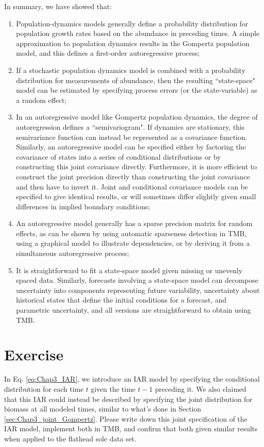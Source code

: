 In summary, we have showed that:
\begin{enumerate}
    \item Population-dynamics models generally define a probability distribution for population growth rates based on the abundance in preceding times. A simple approximation to population dynamics results in the Gompertz population model, and this defines a first-order autoregressive process;

    \item If a stochastic population dynamics model is combined with a probability distribution for measurements of abundance, then the resulting ``state-space" model can be estimated by specifying process errors (or the state-variable) as a random effect;
    
    \item In an autoregressive model like Gompertz population dynamics, the degree of autoregression defines a ``semivariogram". If dynamics are stationary, this semivariance function can instead be represented as a covariance function. Similarly, an autoregressive model can be specified either by factoring the covariance of states into a series of conditional distributions or by constructing this joint covariance directly. Furthermore, it is more efficient to construct the joint precision directly than constructing the joint covariance and then have to invert it.  Joint and conditional covariance models can be specified to give identical results, or will sometimes differ slightly given small differences in implied boundary conditions;
    
    \item An autoregressive model generally has a sparse precision matrix for random effects, as can be shown by using automatic sparseness detection in TMB, using a graphical model to illustrate dependencies, or by deriving it from a simultaneous autoregressive process;
    
    \item It is straightforward to fit a state-space model given missing or unevenly spaced data. Similarly, forecasts involving a state-space model can decompose uncertainty into components representing future variability, uncertainty about historical states that define the initial conditions for a forecast, and parametric uncertainty, and all versions are straightforward to obtain using TMB. 
\end{enumerate}

\section{Exercise}

In Eq. \ref{eq:Chap3_IAR}, we introduce an IAR model by specifying the conditional distribution for each time \(t\) given the time \(t-1\) preceding it.  We also claimed that this IAR could instead be described by specifying the joint distribution for biomass at all modeled times, similar to what's done in Section \ref{sec:Chap3_joint_Gompertz}.  Please write down this joint specification of the IAR model, implement both in TMB, and confirm that both given similar results when applied to the flathead sole data set. 

